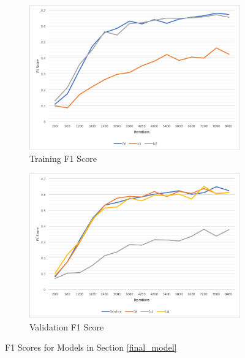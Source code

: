 \documentclass[a4paper, 11pt]{article}
\begin{document}
\begin{figure}
	\centering
      \begin{subfigure}{.5\textwidth}
        \centering
        \includegraphics[width=.97\linewidth]{DCN_TR_F1.png}
        \caption{Training F1 Score}
        \label{fig:train_f1}
      \end{subfigure}%
      \begin{subfigure}{.5\textwidth}
        \centering
        \includegraphics[width=.94\linewidth]{DCN_VAL_F1+Baseline.png}
        \caption{Validation F1 Score}
        \label{fig:val_f1}
      \end{subfigure}
      \caption{F1 Scores for Models in Section \ref{final_model}}
      \label{fig:test}
\end{figure}
\end{document}
